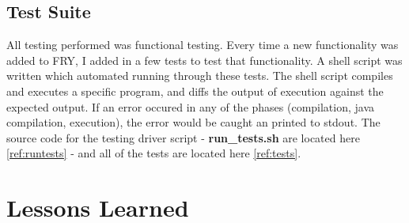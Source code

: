 \documentclass{article}
\begin{document}
\subsection{Test Suite}
All testing performed was functional testing. Every time a new functionality was added to FRY, I added in a few tests to test that functionality. A shell script was written which automated running through these tests. The shell script compiles and executes a specific program, and diffs the output of execution against the expected output. If an error occured in any of the phases (compilation, java compilation, execution), the error would be caught an printed to stdout. The source code for the testing driver script - \textbf{run\_tests.sh} are located here \ref{ref:runtests} - and all of the tests are located here \ref{ref:tests}.

\section{Lessons Learned}
\end{document}
